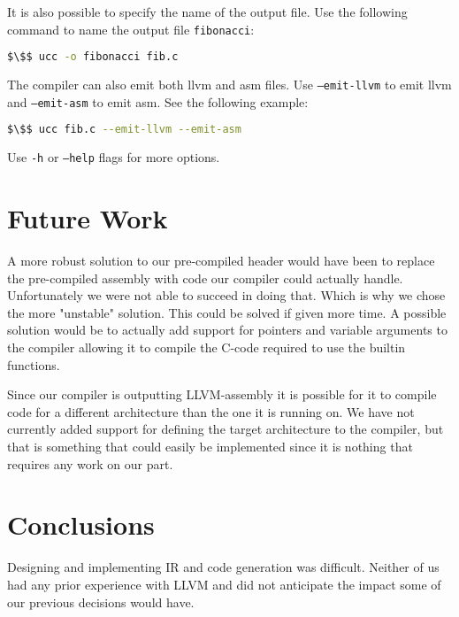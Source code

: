 It is also possible to specify the name of the output file. Use the following command to name the output file \texttt{fibonacci}:
\begin{lstlisting}[language=bash,numbers=none]
    $\$$ ucc -o fibonacci fib.c
\end{lstlisting}

The compiler can also emit both llvm and asm files. Use \texttt{--emit-llvm} to emit llvm and \texttt{--emit-asm} to emit asm. See the following example:
\begin{lstlisting}[language=bash,numbers=none]
    $\$$ ucc fib.c --emit-llvm --emit-asm
\end{lstlisting}

Use \texttt{-h} or \texttt{--help} flags for more options.


\section{Future Work}

A more robust solution to our pre-compiled header would have been to replace the pre-compiled assembly with code our compiler could actually handle. Unfortunately we were not able to succeed in doing that. Which is why we chose the more "unstable" solution. This could be solved if given more time. A possible solution would be to actually add support for pointers and variable arguments to the compiler allowing it to compile the C-code required to use the builtin functions.


Since our compiler is outputting LLVM-assembly it is possible for it to compile code for a different architecture than the one it is running on. We have not currently added support for defining the target architecture to the compiler, but that is something that could easily be implemented since it is nothing that requires any work on our part.

\section{Conclusions}

Designing and implementing IR and code generation was difficult. Neither of us had any prior experience with LLVM and did not anticipate the impact some of our previous decisions would have.

